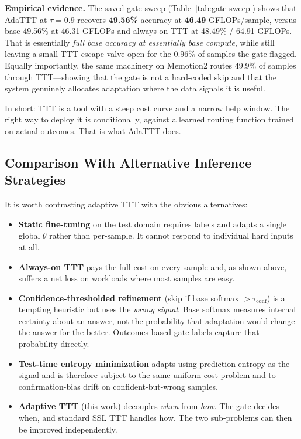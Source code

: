 \documentclass[conference]{IEEEtran}
\begin{document}
\textbf{Empirical evidence.} The saved gate sweep
(Table~\ref{tab:gate-sweep}) shows that AdaTTT at $\tau{=}0.9$ recovers
\textbf{49.56\%} accuracy at \textbf{46.49} GFLOPs/sample, versus base
49.56\% at 46.31 GFLOPs and always-on TTT at 48.49\% / 64.91 GFLOPs.
That is essentially \emph{full base accuracy at essentially base
compute}, while still leaving a small TTT escape valve open for the
0.96\% of samples the gate flagged. Equally importantly, the same
machinery on Memotion2 routes 49.9\% of samples through TTT---showing
that the gate is not a hard-coded skip and that the system genuinely
allocates adaptation where the data signals it is useful.

In short: TTT is a tool with a steep cost curve and a narrow help window.
The right way to deploy it is conditionally, against a learned routing
function trained on actual outcomes. That is what AdaTTT does.

\subsection{Comparison With Alternative Inference Strategies}
\label{sec:alternatives}

It is worth contrasting adaptive TTT with the obvious alternatives:

\begin{itemize}
\item \textbf{Static fine-tuning} on the test domain requires labels and
adapts a single global $\theta$ rather than per-sample. It cannot
respond to individual hard inputs at all.
\item \textbf{Always-on TTT} pays the full cost on every sample and, as
shown above, suffers a net loss on workloads where most samples are
easy.
\item \textbf{Confidence-thresholded refinement} (skip if base softmax
$> \tau_{\mathrm{conf}}$) is a tempting heuristic but uses the
\emph{wrong signal}. Base softmax measures internal certainty about an
answer, not the probability that adaptation would change the answer for
the better. Outcomes-based gate labels capture that probability directly.
\item \textbf{Test-time entropy minimization} adapts using prediction
entropy as the signal and is therefore subject to the same uniform-cost
problem and to confirmation-bias drift on confident-but-wrong samples.
\item \textbf{Adaptive TTT} (this work) decouples \emph{when} from
\emph{how}. The gate decides when, and standard SSL TTT handles how.
The two sub-problems can then be improved independently.
\end{itemize}
\end{document}
